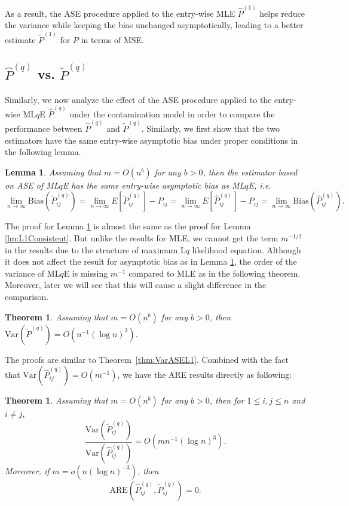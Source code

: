 \documentclass[a4paper]{article}
\newtheorem{lemma}[fact]{Lemma}
\newtheorem{theorem}[fact]{Theorem}
\renewcommand{\hat}{\widehat}
\begin{document}
As a result, the ASE procedure applied to the entry-wise MLE $\hat{P}^{(1)}$ helps reduce the variance while keeping the bias unchanged asymptotically, leading to a better estimate $\widetilde{P}^{(1)}$ for $P$ in terms of MSE.



\subsection{$\hat{P}^{(q)}$ vs. $\widetilde{P}^{(q)}$}

Similarly, we now analyze the effect of the ASE procedure applied to the entry-wise ML$q$E $\hat{P}^{(q)}$ under the contamination model in order to compare the performance between $\hat{P}^{(q)}$ and $\widetilde{P}^{(q)}$. Similarly, we first show that the two estimators have the same entry-wise asymptotic bias under proper conditions in the following lemma.

\begin{lemma}
\label{lm:LqConsistent}
Assuming that $m = O(n^b)$ for any $b > 0$, then the estimator based on ASE of ML$q$E has the same entry-wise asymptotic bias as ML$q$E, i.e.
\[
	\lim_{n \to \infty} \mathrm{Bias}(\widetilde{P}_{ij}^{(q)}) = \lim_{n \to \infty} E[\widetilde{P}_{ij}^{(q)}] - P_{ij} = \lim_{n \to \infty} E[\hat{P}^{(q)}_{ij}] - P_{ij}
    = \lim_{n \to \infty} \mathrm{Bias}(\hat{P}_{ij}^{(q)}).
\]
\end{lemma}

The proof for Lemma \ref{lm:LqConsistent} is almost the same as the proof for Lemma \ref{lm:L1Consistent}. But unlike the results for MLE, we cannot get the term $m^{-1/2}$ in the results due to the structure of maximum L$q$ likelihood equation. Although it does not affect the result for asymptotic bias as in Lemma \ref{lm:LqConsistent}, the order of the variance of ML$q$E is missing $m^{-1}$ compared to MLE as in the following theorem. Moreover, later we will see that this will cause a slight difference in the comparison. 

\begin{theorem}
\label{thm:VarASELq}
Assuming that $m = O(n^b)$ for any $b > 0$, then $\mathrm{Var}(\widetilde{P}^{(q)}) = O(n^{-1} (\log n)^3)$.
\end{theorem}

The proofs are similar to Theorem~\ref{thm:VarASEL1}. Combined with the fact that $\mathrm{Var}(\hat{P}_{ij}^{(q)}) = O(m^{-1})$, we have the ARE results directly as following:

\begin{theorem}
\label{thm:ARELq}
Assuming that $m = O(n^b)$ for any $b > 0$,  then for $1 \le i, j \le n$ and $i \ne j$,
\[
	\frac{\mathrm{Var}(\widetilde{P}_{ij}^{(q)})}{\mathrm{Var}(\hat{P}_{ij}^{(q)})}
    = O(m n^{-1} (\log n)^3).
\]
Moreover, if $m = o(n (\log n)^{-3})$, then
\[
	\mathrm{ARE}(\hat{P}_{ij}^{(q)}, \widetilde{P}_{ij}^{(q)}) = 0.
\]
\end{theorem}
\end{document}
